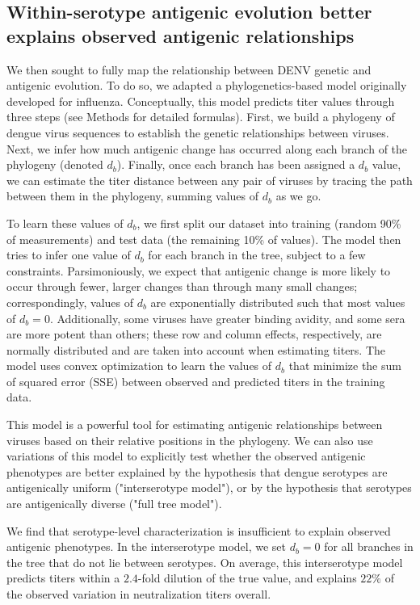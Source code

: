 \documentclass[11pt,oneside,letterpaper]{article}
\begin{document}
\subsection{Within-serotype antigenic evolution better explains observed antigenic relationships}
We then sought to fully map the relationship between DENV genetic and antigenic evolution.
To do so, we adapted a phylogenetics-based model originally developed for influenza. %
Conceptually, this model predicts titer values through three steps (see Methods for detailed formulas).
First, we build a phylogeny of dengue virus sequences to establish the genetic relationships between viruses.
Next, we infer how much antigenic change has occurred along each branch of the phylogeny (denoted $d_b$).
Finally, once each branch has been assigned a $d_b$ value, we can estimate the titer distance between any pair of viruses by tracing the path between them in the phylogeny, summing values of $d_b$ as we go.

To learn these values of $d_b$, we first split our dataset into training (random 90\% of measurements) and test data (the remaining 10\% of values).
The model then tries to infer one value of $d_b$ for each branch in the tree, subject to a few constraints.
Parsimoniously, we expect that antigenic change is more likely to occur through fewer, larger changes than through many small changes; correspondingly, values of $d_b$ are exponentially distributed such that most values of $d_b = 0$.
Additionally, some viruses have greater binding avidity, and some sera are more potent than others; these row and column effects, respectively, are normally distributed and are taken into account when estimating titers.
The model uses convex optimization to learn the values of $d_b$ that minimize the sum of squared error (SSE) between observed and predicted titers in the training data.

This model is a powerful tool for estimating antigenic relationships between viruses based on their relative positions in the phylogeny.
We can also use variations of this model to explicitly test whether the observed antigenic phenotypes are better explained by the hypothesis that dengue serotypes are antigenically uniform ("interserotype model"), or by the hypothesis that serotypes are antigenically diverse ("full tree model").

We find that serotype-level characterization is insufficient to explain observed antigenic phenotypes.
In the interserotype model, we set $d_b = 0$ for all branches in the tree that do not lie between serotypes.
On average, this interserotype model predicts titers within a $2.4$-fold dilution of the true value, and explains $22\%$ of the observed variation in neutralization titers overall.
\end{document}

